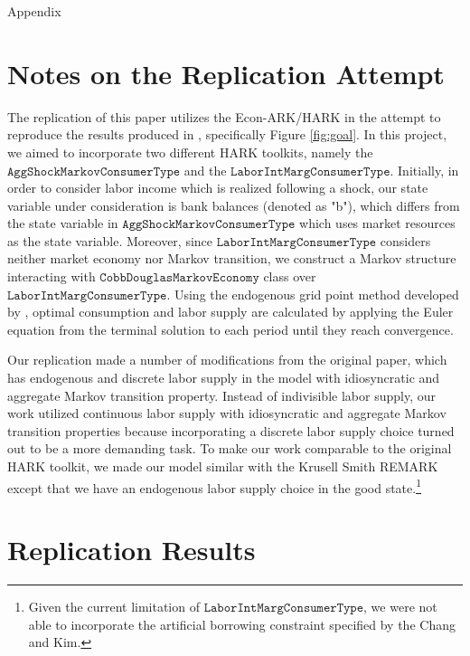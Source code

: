 \documentclass[titlepage,letterpaper]{\econtex}
\begin{document}
\vfill\eject
\appendix

\centerline{\LARGE Appendix}
\medskip

\hfill

\section{Notes on the Replication Attempt}\label{sec:Notes}

The replication of this paper utilizes the Econ-ARK/HARK in the attempt to reproduce the results produced in \citet{changkim2007}, specifically Figure \ref{fig:goal}. In this project, we aimed to incorporate two different HARK toolkits,  namely the $\texttt{AggShockMarkovConsumerType}$ and the $\texttt{LaborIntMargConsumerType}$. Initially, in order to consider labor income which is realized following a shock, our state variable under consideration is bank balances (denoted as "b"), which differs from the state variable in  $\texttt{AggShockMarkovConsumerType}$ which uses market resources as the state variable. Moreover, since  $\texttt{LaborIntMargConsumerType}$ considers neither market economy nor Markov transition, we construct a Markov structure interacting with  $\texttt{CobbDouglasMarkovEconomy}$ class over  $\texttt{LaborIntMargConsumerType}$. Using the endogenous grid point method developed by \citet{Carroll2006}, optimal consumption and labor supply are calculated by applying the Euler equation from the terminal solution to each period until they reach convergence.

Our replication made a number of modifications from the original paper, which has endogenous and discrete labor supply in the model with idiosyncratic and aggregate Markov transition property. Instead of indivisible labor supply, our work utilized continuous labor supply with idiosyncratic and aggregate Markov transition properties because incorporating a discrete labor supply choice turned out to be a more demanding task. To make our work comparable to the original HARK toolkit, we made our model similar with the Krusell Smith REMARK except that we have an endogenous labor supply choice in the good state.\footnote{Given the current limitation of $\texttt{LaborIntMargConsumerType}$, we were not able to incorporate the artificial borrowing constraint specified by the Chang and Kim.}

\section{Replication Results}\label{sec:Results}
\end{document}
